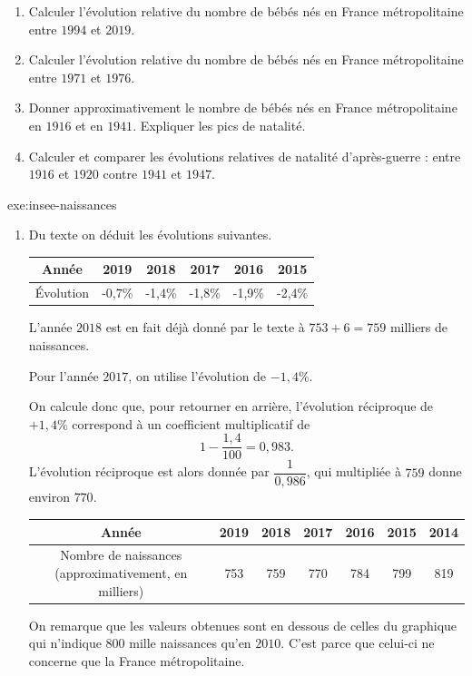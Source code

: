 {\begin{enumerate}
		\item Calculer l'évolution relative du nombre de bébés nés en France métropolitaine entre $1994$ et $2019$.
		
		\item Calculer l'évolution relative du nombre de bébés nés en France métropolitaine entre $1971$ et $1976$.
		
		\item Donner approximativement le nombre de bébés nés en France métropolitaine en $1916$ et en $1941$. Expliquer les pics de natalité.
		
		\item Calculer et comparer les évolutions relatives de natalité d'après-guerre : entre $1916$ et $1920$ contre $1941$ et $1947$.
	\end{enumerate}
}{exe:insee-naissances}{
	\begin{enumerate}
		\item Du texte on déduit les évolutions suivantes.
		
		\begin{tabular}{|c|c|c|c|c|c|}\hline
			Année & 2019 & 2018 & 2017 & 2016 & 2015 \\ \hline
			Évolution & -0,7\% & -1,4\% & -1,8\% & -1,9\% & -2,4\% \\ \hline
		\end{tabular}
		
		L'année $2018$ est en fait déjà donné par le texte à $753+6 = 759$ milliers de naissances.
		
		Pour l'année $2017$, on utilise l'évolution de $-1,4\%$.
		
		On calcule donc que, pour retourner en arrière, l'évolution réciproque de $+1,4\%$ correspond à un coefficient multiplicatif de 
			\[ 1-\dfrac{1,4}{100} = 0,983. \]
		L'évolution réciproque est alors donnée par $\dfrac{1}{0,986}$, qui multipliée à $759$ donne environ $770$.
		
		\begin{tabular}{|c|c|c|c|c|c|c|}\hline
			Année & 2019 & 2018 & 2017 & 2016 & 2015 & 2014 \\ \hline
			\makecell{Nombre de  naissances \\ (approximativement, en milliers)} & 753 & 759 & 770 & 784 & 799 & 819 \\ \hline
		\end{tabular}
		
		On remarque que les valeurs obtenues sont en dessous de celles du graphique qui n'indique $800$ mille naissances qu'en $2010$.
		C'est parce que celui-ci ne concerne que la France métropolitaine.
		

\end{enumerate}}
